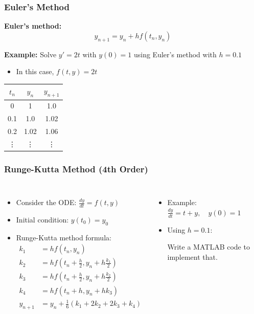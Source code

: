 \documentclass[aspectratio=169,xcolor=dvipsnames,svgnames,x11names,fleqn]{beamer}
\begin{document}
\begin{frame}
    \frametitle{Euler's Method}
    \textbf{Euler's method:}
    \begin{equation*}
        y_{n+1} = y_n + hf(t_n, y_n)
    \end{equation*}
    
    \textbf{Example:} Solve $y' = 2t$ with $y(0) = 1$ using Euler's method with $h = 0.1$
    \begin{itemize}
        \item In this case, $f(t, y) = 2t$
    \end{itemize}
    \begin{table}
        \begin{tabular}{c|c|c}
        $t_n$ & $y_n$ & $y_{n+1}$ \\
        \hline
        0 & 1 & 1.0 \\
        0.1 & 1.0 & 1.02 \\
        0.2 & 1.02 & 1.06 \\
        \vdots & \vdots & \vdots
        \end{tabular}
    \end{table}
\end{frame}

\begin{frame}
\frametitle{Runge-Kutta Method (4th Order)}
\begin{columns}
    \begin{itemize}
            \item Consider the ODE: $ \frac{dy}{dt} = f(t, y) $
    \item Initial condition: $ y(t_0) = y_0 $
    \item Runge-Kutta method formula:
    $$
    \begin{aligned}
    k_1 &= h f(t_n, y_n) \\
    k_2 &= h f\left(t_n + \frac{h}{2}, y_n + h \frac{k_1}{2}\right) \\
    k_3 &= h f\left(t_n + \frac{h}{2}, y_n + h \frac{k_2}{2}\right) \\
    k_4 &= h f(t_n + h, y_n + h k_3) \\
    y_{n+1} &= y_n + \frac{1}{6}(k_1 + 2k_2 + 2k_3 + k_4)
    \end{aligned}
    $$
    \end{itemize}

\begin{itemize}
    
        \item Example: $ \frac{dy}{dt} = t + y, \quad y(0) = 1 $
        \item Using $ h = 0.1 $:
    
    Write a MATLAB code to implement that.
\end{itemize}
\end{columns}
\end{frame}
\end{document}
